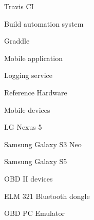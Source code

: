 Travis CI

\secc Build automation system

Graddle


\secc Mobile application

\secc Logging service

\sec Reference Hardware

\secc Mobile devices

\seccc LG Nexus 5

\seccc Samsung Galaxy S3 Neo

\seccc Samsung Galaxy S5

\secc OBD II devices

\seccc ELM 321 Bluetooth dongle 

\seccc OBD PC Emulator
 






